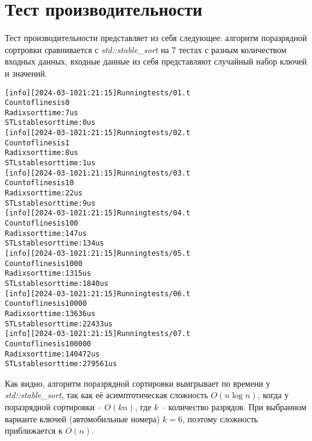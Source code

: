 \section{Тест производительности}


Тест производительности представляет из себя следующее: 
алгоритм поразрядной сортровки сравнивается с \textit{std::stable\_sort} на 7 тестах с разным количеством входных данных, 
входные данные из себя представляют случайный набор ключей и значений.

\begin{alltt}
[info] [2024-03-10 21:21:15] Running tests/01.t
Count of lines is 0
Radix sort time: 7us
STL stable sort time: 0us
[info] [2024-03-10 21:21:15] Running tests/02.t
Count of lines is 1
Radix sort time: 8us
STL stable sort time: 1us
[info] [2024-03-10 21:21:15] Running tests/03.t
Count of lines is 10
Radix sort time: 22us
STL stable sort time: 9us
[info] [2024-03-10 21:21:15] Running tests/04.t
Count of lines is 100
Radix sort time: 147us
STL stable sort time: 134us
[info] [2024-03-10 21:21:15] Running tests/05.t
Count of lines is 1000
Radix sort time: 1315us
STL stable sort time: 1840us
[info] [2024-03-10 21:21:15] Running tests/06.t
Count of lines is 10000
Radix sort time: 13636us
STL stable sort time: 22433us
[info] [2024-03-10 21:21:15] Running tests/07.t
Count of lines is 100000
Radix sort time: 140472us
STL stable sort time: 279561us
\end{alltt}

Как видно, алгоритм поразрядной сортировки выигрывает по времени у \textit{std::stable\_sort}, так как её асимптотическая сложность $O(n \log n)$, когда 
у поразрядной сортировки -- $O(k n)$, где $k$ -- количество разрядов. При выбранном варианте ключей (автомобильные номера) $k = 6$, поэтому 
сложность приближается к $O(n)$.

\pagebreak
